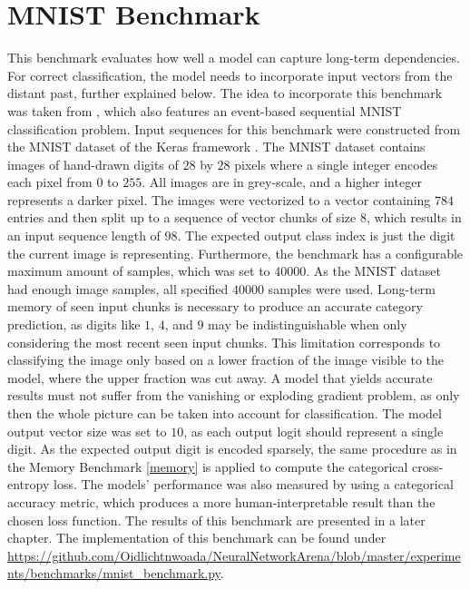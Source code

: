 \documentclass[draft,final]{vutinfth} %
\begin{document}
    \section{MNIST Benchmark} \label{mnist}
    This benchmark evaluates how well a model can capture long-term dependencies. For correct classification, the model needs to incorporate input vectors from the distant past, further explained below.
    The idea to incorporate this benchmark was taken from \cite{ODELSTM}, which also features an event-based sequential MNIST classification problem.
    Input sequences for this benchmark were constructed from the MNIST dataset of the Keras framework \cite{Keras}.
    The MNIST dataset contains images of hand-drawn digits of $28$ by $28$ pixels where a single integer encodes each pixel from $0$ to $255$.
    All images are in grey-scale, and a higher integer represents a darker pixel.
    The images were vectorized to a vector containing $784$ entries and then split up to a sequence of vector chunks of size $8$, which results in an input sequence length of $98$.
    The expected output class index is just the digit the current image is representing.
    Furthermore, the benchmark has a configurable maximum amount of samples, which was set to $40000$.
    As the MNIST dataset had enough image samples, all specified $40000$ samples were used.
    Long-term memory of seen input chunks is necessary to produce an accurate category prediction, as digits like $1$, $4$, and $9$ may be indistinguishable when only considering the most recent seen input chunks.
    This limitation corresponds to classifying the image only based on a lower fraction of the image visible to the model, where the upper fraction was cut away.
    A model that yields accurate results must not suffer from the vanishing or exploding gradient problem, as only then the whole picture can be taken into account for classification. 
    The model output vector size was set to $10$, as each output logit should represent a single digit.
    As the expected output digit is encoded sparsely, the same procedure as in the Memory Benchmark \ref{memory} is applied to compute the categorical cross-entropy loss.
    The models' performance was also measured by using a categorical accuracy metric, which produces a more human-interpretable result than the chosen loss function.
    The results of this benchmark are presented in a later chapter.
    The implementation of this benchmark can be found under \url{https://github.com/Oidlichtnwoada/NeuralNetworkArena/blob/master/experiments/benchmarks/mnist_benchmark.py}.
\end{document}

